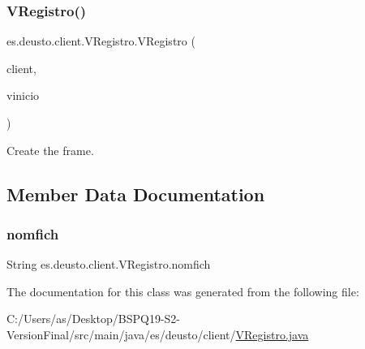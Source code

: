 \subsubsection{\texorpdfstring{VRegistro()}{VRegistro()}}
{\footnotesize\ttfamily es.\+deusto.\+client.\+V\+Registro.\+V\+Registro (\begin{DoxyParamCaption}\item[{\mbox{\hyperlink{classes_1_1deusto_1_1client_1_1_client}{Client}}}]{client,  }\item[{\mbox{\hyperlink{classes_1_1deusto_1_1client_1_1_v_inicio}{V\+Inicio}}}]{vinicio }\end{DoxyParamCaption})}

Create the frame. 

\subsection{Member Data Documentation}
\mbox{\label{classes_1_1deusto_1_1client_1_1_v_registro_aaed4b25a7461d8f707107022b6c9b6e6}} 
\subsubsection{\texorpdfstring{nomfich}{nomfich}}
{\footnotesize\ttfamily String es.\+deusto.\+client.\+V\+Registro.\+nomfich\hspace{0.3cm}{\ttfamily [static]}}



The documentation for this class was generated from the following file\+:\begin{DoxyCompactItemize}
\item 
C\+:/\+Users/as/\+Desktop/\+B\+S\+P\+Q19-\/\+S2-\/\+Version\+Final/src/main/java/es/deusto/client/\mbox{\hyperlink{_v_registro_8java}{V\+Registro.\+java}}\end{DoxyCompactItemize}
